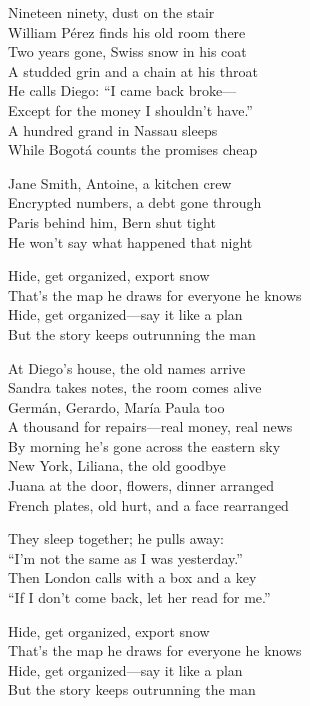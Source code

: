 \begin{lyrics}
Nineteen ninety, dust on the stair\\
William Pérez finds his old room there\\
Two years gone, Swiss snow in his coat\\
A studded grin and a chain at his throat\\
He calls Diego: “I came back broke—\\
Except for the money I shouldn’t have.”\\
A hundred grand in Nassau sleeps\\
While Bogotá counts the promises cheap

Jane Smith, Antoine, a kitchen crew\\
Encrypted numbers, a debt gone through\\
Paris behind him, Bern shut tight\\
He won’t say what happened that night

Hide, get organized, export snow\\
That’s the map he draws for everyone he knows\\
Hide, get organized—say it like a plan\\
But the story keeps outrunning the man

At Diego’s house, the old names arrive\\
Sandra takes notes, the room comes alive\\
Germán, Gerardo, María Paula too\\
A thousand for repairs—real money, real news\\
By morning he’s gone across the eastern sky\\
New York, Liliana, the old goodbye\\
Juana at the door, flowers, dinner arranged\\
French plates, old hurt, and a face rearranged

They sleep together; he pulls away:\\
“I’m not the same as I was yesterday.”\\
Then London calls with a box and a key\\
“If I don’t come back, let her read for me.”

Hide, get organized, export snow\\
That’s the map he draws for everyone he knows\\
Hide, get organized—say it like a plan\\
But the story keeps outrunning the man


\end{lyrics}
